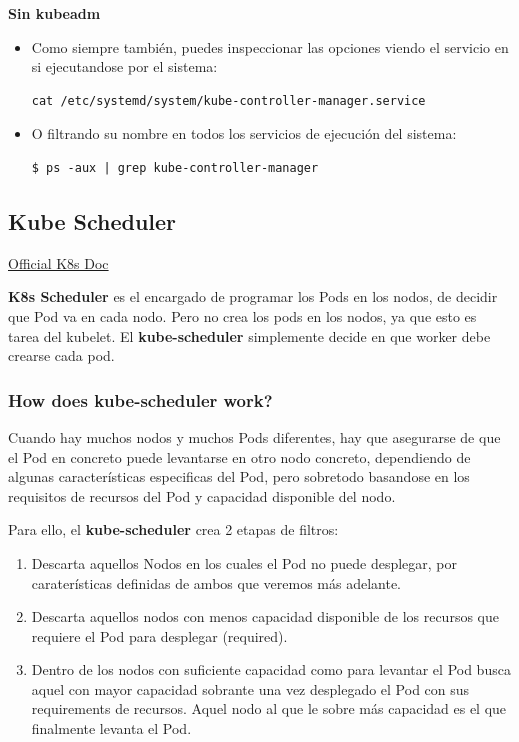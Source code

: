 \documentclass{article}
\newenvironment{codetemplate}[1][]{%
  \mybasecolorbox[#1]
  \itshape
}{%
  \endmybasecolorbox
}
\begin{document}
\textbf{Sin kubeadm}

\begin{itemize}
    \item Como siempre también, puedes inspeccionar las opciones viendo el servicio en si ejecutandose por el sistema:
\begin{codetemplate}{}
\begin{verbatim}
cat /etc/systemd/system/kube-controller-manager.service
\end{verbatim}
\end{codetemplate}

    \item O filtrando su nombre en todos los servicios de ejecución del sistema:
\begin{codetemplate}{}
\begin{verbatim}
$ ps -aux | grep kube-controller-manager
\end{verbatim}
\end{codetemplate}
\end{itemize}

\subsection{Kube Scheduler}

\href{https://kubernetes.io/docs/reference/command-line-tools-reference/kube-scheduler/}{Official K8s Doc}

\textbf{K8s Scheduler} es el encargado de programar los Pods en los nodos, de decidir que Pod va en cada nodo. Pero no crea los pods en los nodos, ya que esto es tarea del kubelet. El \textbf{kube-scheduler} simplemente decide en que worker debe crearse cada pod.

\subsubsection{How does kube-scheduler work?}

Cuando hay muchos nodos y muchos Pods diferentes, hay que asegurarse de que el Pod en concreto puede levantarse en otro nodo concreto, dependiendo de algunas características especificas del Pod, pero sobretodo basandose en los requisitos de recursos del Pod y capacidad disponible del nodo.

Para ello, el \textbf{kube-scheduler} crea 2 etapas de filtros:

\label{Scheduling}
\begin{enumerate}
    \item Descarta aquellos Nodos en los cuales el Pod no puede desplegar, por caraterísticas definidas de ambos que veremos más adelante.
    \item Descarta aquellos nodos con menos capacidad disponible de los recursos que requiere el Pod para desplegar (required).
    \item Dentro de los nodos con suficiente capacidad como para levantar el Pod busca aquel con mayor capacidad sobrante una vez desplegado el Pod con sus requirements de recursos. Aquel nodo al que le sobre más capacidad es el que finalmente levanta el Pod.
\end{enumerate}
\end{document}
